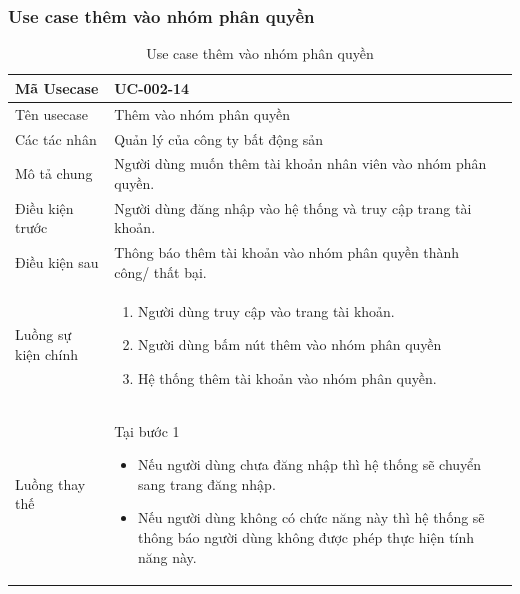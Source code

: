 \documentclass[12pt,a4paper]{article}
\begin{document}

    \subsubsection*{Use case thêm vào nhóm phân quyền}
    \begin{table}[H]
        \centering
        \begin{tabular}{|p{3.5cm}|p{11.5cm}|c|}
            \hline
            Mã Usecase      & UC-002-14                                                          \\
            \hline
            Tên usecase     & Thêm vào nhóm phân quyền                                           \\
            \hline
            Các tác nhân    & Quản lý của công ty bất động sản                                   \\
            \hline
            Mô tả chung     & Người dùng muốn thêm tài khoản nhân viên vào nhóm phân quyền.      \\
            \hline
            Điều kiện trước & Người dùng đăng nhập vào hệ thống và truy cập trang tài khoản.     \\
            \hline
            Điều kiện sau   & Thông báo thêm tài khoản vào nhóm phân quyền thành công/ thất bại. \\
            \hline
            Luồng sự kiện chính & \vspace{-.8cm}\begin{enumerate}
                                                    \item Người dùng truy cập vào trang tài khoản.
                                                    \item Người dùng bấm nút thêm vào nhóm phân quyền
                                                    \item Hệ thống thêm tài khoản vào nhóm phân quyền.
            \end{enumerate}
            \\
            \hline
            Luồng thay thế & Tại bước 1\newline
            \vspace{-.8cm}\begin{itemize}
                              \item Nếu người dùng chưa đăng nhập thì hệ thống sẽ chuyển sang trang đăng nhập.
                              \item Nếu người dùng không có chức năng này thì hệ thống sẽ thông báo người dùng không được phép thực hiện tính năng này.
            \end{itemize}
            \\ \hline
        \end{tabular}
        \caption{Use case thêm vào nhóm phân quyền}
    \end{table}
\end{document}
